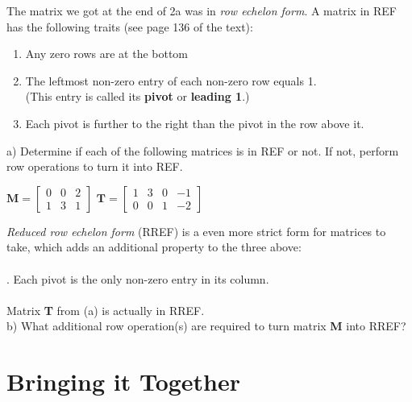 \documentclass{article}
\begin{document}
\begin{flushleft}
The matrix we got at the end of 2a was in \textit{row echelon form}. A matrix in REF has the following traits (see page 136 of the text):

\begin{enumerate}
	\item Any zero rows are at the bottom
	\item The leftmost non-zero entry of each non-zero row equals 1.\\
 (This entry is called its \textbf{pivot} or \textbf{leading 1}.)
	\item Each pivot is further to the right than the pivot in the row above it.
\end{enumerate}

a) Determine if each of the following matrices is in REF or not. If not, perform row operations to turn it into REF.\\

\vspace{0.1in}
\begin{center}
$\textbf{M}=\begin{bmatrix}
0 & 0 & 2\\
1 & 3 & 1
\end{bmatrix}
$
\hspace{0.2in}
$\textbf{T}=\begin{bmatrix}
1 & 3 & 0 & -1 \\
0 & 0 & 1 & -2
\end{bmatrix}$\\
\end{center}

\vspace{2.5in}

\textit{Reduced row echelon form} (RREF) is a even more strict form for matrices to take, which adds an additional property to the three above:\\
\vspace{0.1in}
\hrulefill \\
. Each pivot is the only non-zero entry in its column.\\
\vspace{-3pt}
\hrulefill \\
\vspace{0.1in}
Matrix \textbf{T} from (a) is actually in RREF.\\


b) What additional row operation(s) are required to turn matrix \textbf{M} into RREF?

\newpage

\section{Bringing it Together}


\end{flushleft}
\end{document}
